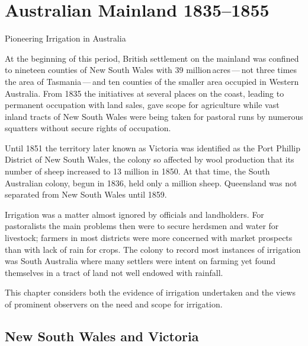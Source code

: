 
\setcounter{endnote}{0}

\chapter{Australian Mainland 1835--1855}
\label{ch:mainland} 
%
{Pioneering Irrigation in Australia}

At the beginning of this period, British settlement on the mainland
was confined to nineteen counties of New South Wales with 39
million\,acres\,---\,not three times the area of Tasmania\,---\,and
ten counties of the smaller area occupied in Western Australia.  From
1835 the initiatives at several places on the coast, leading to
permanent occupation with land sales, gave scope for agriculture while
vast inland tracts of New South Wales were being taken for pastoral
runs by numerous squatters without secure rights of occupation.

Until 1851 the territory later known as Victoria was identified as the
Port Phillip District of New South Wales, the colony so affected by
wool production that its number of sheep increased to 13 million in
1850.  At that time, the South Australian colony, begun in 1836, held
only a million sheep.  Queensland was not separated from New South
Wales until 1859.

Irrigation was a matter almost ignored by officials and landholders.
For pastoralists the main problems then were to secure herdsmen and
water for livestock; farmers in most districts were more concerned
with market prospects than with lack of rain for crops.  The colony to
record most instances of irrigation was South Australia where many
settlers were intent on farming yet found themselves in a tract of
land not well endowed with rainfall.

This chapter considers both the evidence of irrigation undertaken and
the views of prominent observers on the need and scope for irrigation.

\section*{New South Wales and Victoria}
 

